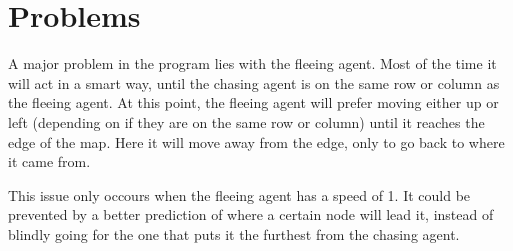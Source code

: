 \section{Problems}
\label{04}

A major problem in the program lies with the fleeing agent. Most of the time it will act in a smart way, until the chasing agent is on the same row or column as the fleeing agent. At this point, the fleeing agent will prefer moving either up or left (depending on if they are on the same row or column) until it reaches the edge of the map. Here it will move away from the edge, only to go back to where it came from. 

This issue only occours when the fleeing agent has a speed of 1. It could be prevented by a better prediction of where a certain node will lead it, instead of blindly going for the one that puts it the furthest from the chasing agent.